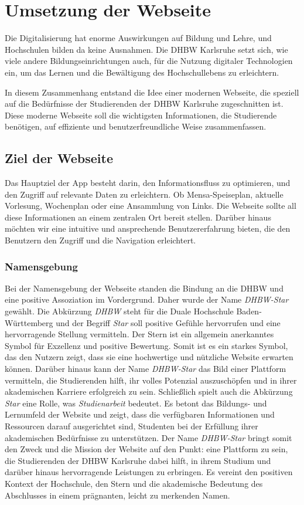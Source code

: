 \chapter{Umsetzung der Webseite}
Die Digitalisierung hat enorme Auswirkungen auf Bildung und Lehre, und Hochschulen bilden da keine Ausnahmen. Die DHBW Karlsruhe setzt sich, wie viele andere Bildungseinrichtungen auch, für die Nutzung digitaler Technologien ein, um das Lernen und die Bewältigung des Hochschullebens zu erleichtern.

In diesem Zusammenhang entstand die Idee einer modernen Webseite, die speziell auf die Bedürfnisse der Studierenden der DHBW Karlsruhe zugeschnitten ist. Diese moderne Webseite soll die wichtigsten Informationen, die Studierende benötigen, auf effiziente und benutzerfreundliche Weise zusammenfassen.

\section{Ziel der Webseite}
Das Hauptziel der App besteht darin, den Informationsfluss zu optimieren, und den Zugriff auf relevante Daten zu erleichtern. Ob Mensa-Speiseplan, aktuelle Vorlesung, Wochenplan oder eine Ansammlung von Links. Die Webseite sollte all diese Informationen an einem zentralen Ort bereit stellen. Darüber hinaus möchten wir eine intuitive und ansprechende Benutzererfahrung bieten, die den Benutzern den Zugriff und die Navigation erleichtert.
\newpage

\subsection{Namensgebung}
Bei der Namensgebung der Webseite standen die Bindung an die DHBW und eine positive Assoziation im Vordergrund. Daher wurde der Name \emph{DHBW-Star} gewählt.  
Die Abkürzung \emph{DHBW} steht  für die Duale Hochschule Baden-Württemberg und der Begriff \emph{Star} soll positive Gefühle hervorrufen und eine hervorragende Stellung vermitteln. Der Stern ist ein allgemein anerkanntes Symbol für Exzellenz und positive Bewertung. Somit ist es ein starkes Symbol, das den Nutzern zeigt, dass sie eine hochwertige und nützliche Website erwarten können. Darüber hinaus kann der Name \emph{DHBW-Star} das Bild einer Plattform vermitteln, die  Studierenden  hilft, ihr volles Potenzial auszuschöpfen und in ihrer akademischen Karriere erfolgreich zu sein. 
Schließlich spielt auch die Abkürzung \emph{Star} eine Rolle, was \emph{Studienarbeit} bedeutet. Es betont das Bildungs- und Lernumfeld der Website und zeigt, dass die verfügbaren Informationen und Ressourcen darauf ausgerichtet sind, Studenten bei der Erfüllung ihrer akademischen Bedürfnisse zu unterstützen. 
Der Name \emph{DHBW-Star} bringt somit den Zweck und die Mission der Website auf den Punkt: eine Plattform zu sein, die Studierenden der DHBW Karlsruhe dabei hilft, in ihrem Studium und darüber hinaus hervorragende Leistungen zu erbringen. Es vereint den positiven Kontext der Hochschule, den Stern und die akademische Bedeutung des Abschlusses in einem prägnanten, leicht zu merkenden Namen.
\newpage
